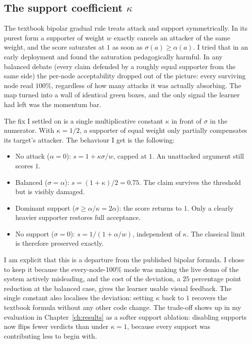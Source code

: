 \subsection{The support coefficient $\kappa$}
\label{sec:support_coefficient}
The textbook bipolar gradual rule treats attack and support symmetrically. In its purest form a supporter of weight $w$ exactly cancels an attacker of the same weight, and the score saturates at $1$ as soon as $\sigma(a) \geq \alpha(a)$. I tried that in an early deployment and found the saturation pedagogically harmful. In any balanced debate (every claim defended by a roughly equal supporter from the same side) the per-node acceptability dropped out of the picture: every surviving node read $100\%$, regardless of how many attacks it was actually absorbing. The map turned into a wall of identical green boxes, and the only signal the learner had left was the momentum bar.

The fix I settled on is a single multiplicative constant $\kappa$ in front of $\sigma$ in the numerator. With $\kappa = 1/2$, a supporter of equal weight only partially compensates its target's attacker. The behaviour I get is the following:
\begin{itemize}
    \item No attack ($\alpha = 0$): $s = 1 + \kappa\sigma/w$, capped at $1$. An unattacked argument still scores $1$.
    \item Balanced ($\sigma = \alpha$): $s = (1 + \kappa) / 2 = 0.75$. The claim survives the threshold but is visibly damaged.
    \item Dominant support ($\sigma \geq \alpha / \kappa = 2\alpha$): the score returns to $1$. Only a clearly heavier supporter restores full acceptance.
    \item No support ($\sigma = 0$): $s = 1/(1+\alpha/w)$, independent of $\kappa$. The classical limit is therefore preserved exactly.
\end{itemize}

I am explicit that this is a departure from the published bipolar formula. I chose to keep it because the every-node-100\% mode was making the live demo of the system actively misleading, and the cost of the deviation, a $25$ percentage point reduction at the balanced case, gives the learner usable visual feedback. The single constant also localises the deviation: setting $\kappa$ back to $1$ recovers the textbook formula without any other code change. The trade-off shows up in my evaluation in Chapter~\ref{ch:results} as a softer support ablation: disabling supports now flips fewer verdicts than under $\kappa = 1$, because every support was contributing less to begin with.

